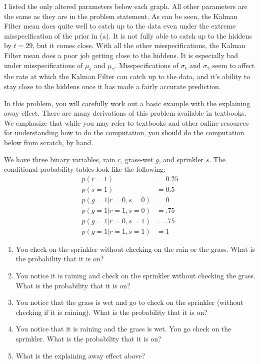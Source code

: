 \documentclass[submit]{harvardml}
\begin{document}
\begin{enumerate}
I listed the only altered parameters below each graph. All other parameters are the same as they are in the problem statement. As can be seen, the Kalman Filter mean does quite well to catch up to the data even under the extreme misspecification of the prior in (a). It is not fully able to catch up to the hiddens by $t =29$, but it comes close. With all the other misspecifications, the Kalman Filter mean does a poor job getting close to the hiddens. It is especially bad under misspecifications of $\mu_\epsilon$ and $\mu_\gamma$. Misspecifications of $\sigma_\epsilon$ and $\sigma_\gamma$ seem to affect the rate at which the Kalman Filter can catch up to the data, and it's ability to stay close to the hiddens once it has made a fairly accurate prediction. 

\end{enumerate}

\newpage

\begin{problem}

  In this problem, you will carefully work out a basic example with
  the explaining away effect.  There are many derivations of this
  problem available in textbooks.  We emphasize that while you may
  refer to textbooks and other online resources for understanding how
  to do the computation, you should do the computation below from
  scratch, by hand.

  We have three binary variables, rain $r$, grass-wet $g$, and
  sprinkler $s$.  The conditional probability tables look like the
  following:
  \begin{eqnarray*}
    p(r = 1) &= 0.25 \\
    p(s = 1) &= 0.5 \\
    p(g = 1 | r = 0 , s = 0 ) &= 0 \\
    p(g = 1 | r = 1 , s = 0 ) &= .75 \\
    p(g = 1 | r = 0 , s = 1 ) &= .75 \\
    p(g = 1 | r = 1 , s = 1 ) &= 1
  \end{eqnarray*}

  \begin{enumerate}
    \item You check on the sprinkler without checking on the rain or
      the grass.  What is the probability that it is on?
    \item You notice it is raining and check on the sprinkler without
      checking the grass.  What is the probability that it is on?
    \item You notice that the grass is wet and go to check on the
      sprinkler (without checking if it is raining).  What is the
      probability that it is on?
    \item You notice that it is raining and the grass is wet.  You go
      check on the sprinkler.  What is the probability that it is on?
    \item What is the explaining away effect above?
    \end{enumerate}

\end{problem}
\end{document}
